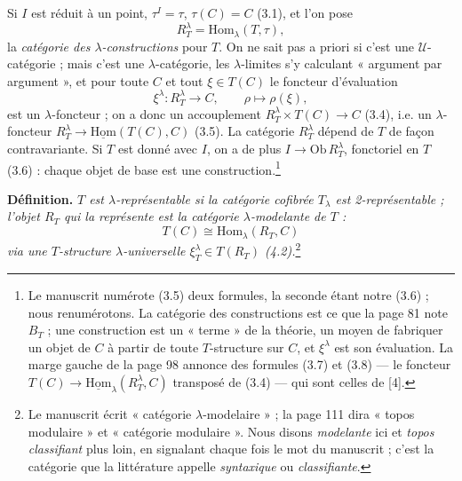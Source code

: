 \documentclass[11pt,a4paper]{article}
\begin{document}
Si $I$ est réduit à un point, $\tau^{I} = \tau$, $\tau(C) = C$ (3.1), et
l'on pose
\begin{equation}
R^{\lambda}_{T} = \mathrm{Hom}_{\lambda}(T, \tau), \tag{3.2}
\end{equation}
la \emph{catégorie des $\lambda$-constructions} pour $T$. On ne sait pas a
priori si c'est une $\mathcal{U}$-catégorie ; mais c'est une
$\lambda$-catégorie, les $\lambda$-limites s'y calculant « argument par
argument », et pour toute $C$ et tout $\xi \in T(C)$ le foncteur
d'évaluation
\begin{equation}
\xi^{\lambda} : R^{\lambda}_{T} \longrightarrow C, \qquad \rho \mapsto \rho(\xi),
\tag{3.3}
\end{equation}
est un $\lambda$-foncteur ; on a donc un accouplement $R^{\lambda}_{T} \times
T(C) \to C$ (3.4), i.e. un $\lambda$-foncteur $R^{\lambda}_{T} \to \underline{
\mathrm{Hom}}(T(C), C)$ (3.5). La catégorie $R^{\lambda}_{T}$ dépend de $T$
de façon contravariante. Si $T$ est donné avec $I$, on a de plus $I
\to \mathrm{Ob}\,R^{\lambda}_{T}$, fonctoriel en $T$ (3.6) : chaque objet de
base est une construction.\footnote{Le manuscrit numérote (3.5) deux
formules, la seconde étant notre (3.6) ; nous renumérotons. La catégorie
des constructions est ce que la page 81 note $B_{T}$ ; une construction
est un « terme » de la théorie, un moyen de fabriquer un objet de $C$ à
partir de toute $T$-structure sur $C$, et $\xi^{\lambda}$ est son
évaluation. La marge gauche de la page 98 annonce des formules (3.7) et
(3.8) — le foncteur $T(C) \to \underline{\mathrm{Hom}}_{\lambda}(R^{\lambda}_{T},
C)$ transposé de (3.4) — qui sont celles de [4].}

\textbf{Définition.} \emph{$T$ est $\lambda$-représentable si la catégorie
cofibrée $T_{\lambda}$ est 2-représentable ; l'objet $R_{T}$ qui la
représente est la \emph{catégorie $\lambda$-modelante} de $T$ :}
\begin{equation}
T(C) \cong \mathrm{Hom}_{\lambda}(R_{T}, C) \tag{4.1}
\end{equation}
\emph{via une $T$-structure $\lambda$-universelle $\xi^{\lambda}_{T} \in
T(R_{T})$ (4.2).}\footnote{Le manuscrit écrit « catégorie
$\lambda$-modelaire » ; la page 111 dira « topos modulaire » et
« catégorie modulaire ». Nous disons \emph{modelante} ici et \emph{topos
classifiant} plus loin, en signalant chaque fois le mot du manuscrit ;
c'est la catégorie que la littérature appelle \emph{syntaxique} ou
\emph{classifiante}.}
\end{document}
